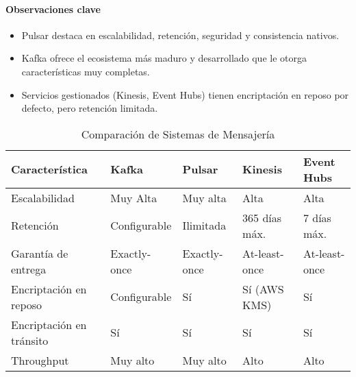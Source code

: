 \paragraph{Observaciones clave}
\begin{itemize}
    \item Pulsar destaca en escalabilidad, retención, seguridad y consistencia nativos.
    \item Kafka ofrece el ecosistema más maduro y desarrollado que le otorga características muy completas.
    \item Servicios gestionados (Kinesis, Event Hubs) tienen encriptación en reposo por defecto, pero retención limitada.
\end{itemize}
\clearpage
\begin{table}[h]
\footnotesize
\begin{tabular}{|p{3cm}|p{2cm}|p{2cm}|p{2cm}|p{2cm}|}
\hline
\textbf{Característica} & \textbf{Kafka} & \textbf{Pulsar} & \textbf{Kinesis} & \textbf{Event Hubs} \\
\hline
    Escalabilidad & Muy Alta & Muy alta & Alta & Alta \\
\hline
Retención & Configurable & Ilimitada & 365 días máx. & 7 días máx. \\
\hline
Garantía de entrega & Exactly-once & Exactly-once & At-least-once & At-least-once \\
\hline
Encriptación en reposo & Configurable & Sí & Sí (AWS KMS) & Sí \\
\hline
Encriptación en tránsito & Sí & Sí & Sí & Sí \\
\hline
Throughput & {Muy alto} & {Muy alto} & {Alto} & {Alto} \\
\hline
\end{tabular}
\caption{Comparación de Sistemas de Mensajería}
\label{tab:comp_mensajeria}
\end{table}
\clearpage
\newpage